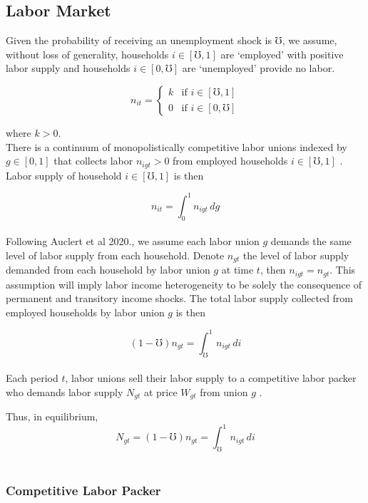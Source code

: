 \documentclass[titlepage]{\econtex}\providecommand{\texname}{BufferStockTheory}
\begin{document}
\hypertarget{Labor Market}{}
\subsection{Labor Market}

Given the probability of receiving an unemployment shock is $\mho$, we assume, without loss of generality, households $i \in [\mho,1]$ are `employed'  with positive labor supply and households $i \in [0, \mho]$  are `unemployed' provide no labor. 

$$
n _{it}=
\begin{cases}
 k  & \text{if  $i \in [\mho, 1]$} \\
 0      & \text{if  $i \in [0, \mho]$} 
\end{cases} 
$$

where $k>0$. \\

There is a continuum of monopolistically competitive labor unions indexed by $g \in [0,1]$ that collects labor $n_{igt} > 0$ from employed households $i \in [\mho,1]$ . Labor supply of household $i \in [\mho,1]$ is then

$$n_{it} = \int_{0}^{1} n_{igt}\,dg$$ \\

Following Auclert et al 2020., we assume each labor union $g$ demands the same level  of labor supply from each household. Denote $n_{gt}$ the level of labor supply demanded from each household by labor union $g$ at time $t$, then   $n_{igt} =\mathit{n}_{gt}$. This assumption will imply labor income heterogeneity to be solely the consequence of  permanent and transitory income shocks.
The total labor supply collected from employed households  by labor union $g$  is then 

$$  (1-\mho) \mathit{n}_{gt} = \int_{\mho}^{1} n_{igt}\,di $$ \\

Each period $t$, labor unions sell their labor supply to a competitive labor packer who demands labor supply $N_{gt}$ at price $W_{gt}$ from union $g$ . 

Thus, in equilibrium, $$  N_{gt} = (1-\mho) \mathit{n}_{gt} = \int_{\mho}^{1} n_{igt}\,di $$  \\


\hypertarget{Competitive Labor Packer}{}
\subsubsection{Competitive Labor Packer}
\end{document}
